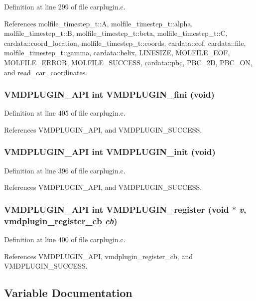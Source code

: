 Definition at line 299 of file carplugin.c.

References molfile\_\-timestep\_\-t::A, molfile\_\-timestep\_\-t::alpha, molfile\_\-timestep\_\-t::B, molfile\_\-timestep\_\-t::beta, molfile\_\-timestep\_\-t::C, cardata::coord\_\-location, molfile\_\-timestep\_\-t::coords, cardata::eof, cardata::file, molfile\_\-timestep\_\-t::gamma, cardata::helix, LINESIZE, MOLFILE\_\-EOF, MOLFILE\_\-ERROR, MOLFILE\_\-SUCCESS, cardata::pbc, PBC\_\-2D, PBC\_\-ON, and read\_\-car\_\-coordinates.
\subsubsection{\setlength{\rightskip}{0pt plus 5cm}VMDPLUGIN\_\-API int VMDPLUGIN\_\-fini (void)}\label{carplugin_8c_a13}




Definition at line 405 of file carplugin.c.

References VMDPLUGIN\_\-API, and VMDPLUGIN\_\-SUCCESS.
\subsubsection{\setlength{\rightskip}{0pt plus 5cm}VMDPLUGIN\_\-API int VMDPLUGIN\_\-init (void)}\label{carplugin_8c_a11}




Definition at line 396 of file carplugin.c.

References VMDPLUGIN\_\-API, and VMDPLUGIN\_\-SUCCESS.
\subsubsection{\setlength{\rightskip}{0pt plus 5cm}VMDPLUGIN\_\-API int VMDPLUGIN\_\-register (void $\ast$ {\em v}, {\bf vmdplugin\_\-register\_\-cb} {\em cb})}\label{carplugin_8c_a12}




Definition at line 400 of file carplugin.c.

References VMDPLUGIN\_\-API, vmdplugin\_\-register\_\-cb, and VMDPLUGIN\_\-SUCCESS.

\subsection{Variable Documentation}
